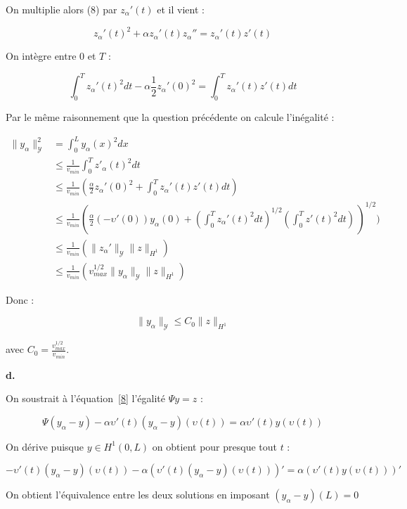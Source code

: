 \documentclass[a4paper]{article}
\newcommand{\Y}{\mathscr{Y}}
\begin{document}
On multiplie alors (8) par $z_{\alpha}'(t)$
et il vient :

\[ z_{\alpha}'(t)^2 + \alpha z_{\alpha}'(t) z_{\alpha}'' = z_{\alpha}'(t)z'(t) \]

On intègre entre $0$ et $T$ :

\[ \displaystyle  \int_0^T z_\alpha '(t)^2 dt - \alpha \frac{1}{2}z_\alpha '(0)^2
          =  \int_0^T z_\alpha '(t)z'(t)dt \]

Par le même raisonnement que la question précédente on calcule l'inégalité :

\[
\begin{split}
\| y_{\alpha} \|_{\mathscr{Y}}^2 &= \int_0^L y_\alpha(x)^2dx \\
	     & \leq \displaystyle \frac{1}{v_{min}} \int_0^T z'_{\alpha}(t)^2dt\\
	     &\leq \displaystyle \frac{1}{v_{min}}
				 ( \frac{\alpha}{2} z_\alpha '(0)^2 
				 	+ \int_0^T z_\alpha '(t)z'(t)dt) \\
		 & \leq \displaystyle \frac{1}{v_{min}}
			(\frac{\alpha}{2}  (-\upsilon'(0)) y_\alpha (0)
			+ (\int_0^T z_\alpha'(t)^2 dt)^{1/2}
			 (\int_0^Tz'(t)^2 dt)\,)^{1/2} ) \\
		&\leq \displaystyle \frac{1}{v_{min}}
			(\| z_\alpha'\|_{\Y} \| z \|_{H^1} ) \\
		& \leq \displaystyle \frac{1}{v_{min}}
			( v_{max}^{1/2} \| y_\alpha \|_{\Y} \| z \|_{H^1} ) 
\end{split}
\]

Donc :

\[ \| y_{\alpha} \|_{\mathscr{Y}} \leq \displaystyle C_0
                                                     \| z \|_{H^1} \]

avec $C_0= \displaystyle \frac{ v_{max}^{1/2} }{ v_{min}}$.


\vspace{0.3cm}
\textbf{d.}

On soustrait à l'équation~\eqref{8} 
l'égalité $\Psi y = z$ :

\[
\Psi (y_\alpha - y) - \alpha \upsilon'(t)(y_\alpha - y)(\upsilon(t)) = \alpha \upsilon'(t) y(\upsilon(t))
\]

On dérive puisque $y \in H^1(0,L)$ on obtient pour presque tout $t$ :

 \[
 - \upsilon'(t)(y_\alpha - y)(\upsilon(t)) - \alpha (\upsilon'(t)(y_\alpha - y)(\upsilon(t)))' = \alpha (\upsilon'(t) y(\upsilon(t)))'
 \]
 
 On obtient l'équivalence entre les deux solutions en imposant $(y_\alpha - y)(L)=0$
 
\end{document}
